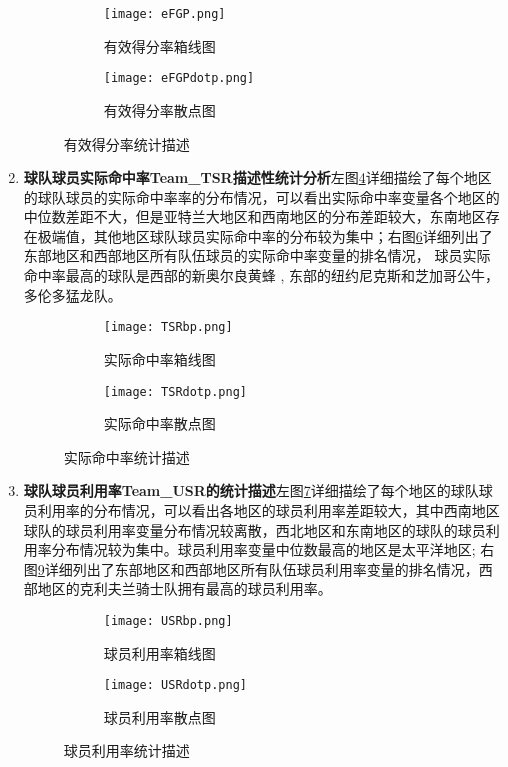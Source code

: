 \begin{enumerate}
\begin{figure}[h!]
	
	\begin{subfigure}{0.5\textwidth}
		\texttt{[image: eFGP.png]} 
		\caption{有效得分率箱线图}
		\label{fig:10}
	\end{subfigure}
	\begin{subfigure}{0.5\textwidth}
		\texttt{[image: eFGPdotp.png]}
		\caption{有效得分率散点图}
		\label{fig:11}
	\end{subfigure}
	\caption{有效得分率统计描述}
\end{figure}

\item {\bfseries 球队球员实际命中率Team\_TSR描述性统计分析}左图\ref{fig:12}详细描绘了每个地区的球队球员的实际命中率率的分布情况，可以看出实际命中率变量各个地区的中位数差距不大，但是亚特兰大地区和西南地区的分布差距较大，东南地区存在极端值，其他地区球队球员实际命中率的分布较为集中；右图\ref{fig:13}详细列出了东部地区和西部地区所有队伍球员的实际命中率变量的排名情况， 球员实际命中率最高的球队是西部的新奥尔良黄蜂
, 东部的纽约尼克斯和芝加哥公牛，多伦多猛龙队。

\begin{figure}[h!]
	
	\begin{subfigure}{0.5\textwidth}
		\texttt{[image: TSRbp.png]} 
		\caption{实际命中率箱线图}
		\label{fig:12}
	\end{subfigure}
	\begin{subfigure}{0.5\textwidth}
		\texttt{[image: TSRdotp.png]}
		\caption{实际命中率散点图}
		\label{fig:13}
	\end{subfigure}
	\caption{实际命中率统计描述}
\end{figure}


\newpage
\item {\bfseries 球队球员利用率Team\_USR的统计描述}左图\ref{fig:14}详细描绘了每个地区的球队球员利用率的分布情况，可以看出各地区的球员利用率差距较大，其中西南地区球队的球员利用率变量分布情况较离散，西北地区和东南地区的球队的球员利用率分布情况较为集中。球员利用率变量中位数最高的地区是太平洋地区; 右图\ref{fig:15}详细列出了东部地区和西部地区所有队伍球员利用率变量的排名情况，西部地区的克利夫兰骑士队拥有最高的球员利用率。
\begin{figure}[h!]
	
	\begin{subfigure}{0.5\textwidth}
		\texttt{[image: USRbp.png]} 
		\caption{球员利用率箱线图}
		\label{fig:14}
	\end{subfigure}
	\begin{subfigure}{0.5\textwidth}
		\texttt{[image: USRdotp.png]}
		\caption{球员利用率散点图}
		\label{fig:15}
	\end{subfigure}
	\caption{球员利用率统计描述}
\end{figure}

	\end{enumerate}







